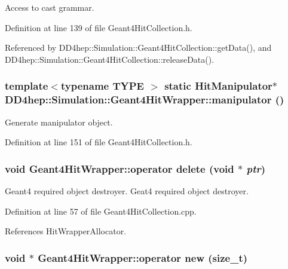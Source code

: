 Access to cast grammar. 

Definition at line 139 of file Geant4HitCollection.h.

Referenced by DD4hep::Simulation::Geant4HitCollection::getData(), and DD4hep::Simulation::Geant4HitCollection::releaseData().\hypertarget{class_d_d4hep_1_1_simulation_1_1_geant4_hit_wrapper_ad5159a11581cd209582a4fa3da961e71}{
\subsubsection[{manipulator}]{\setlength{\rightskip}{0pt plus 5cm}template$<$typename TYPE $>$ static {\bf HitManipulator}$\ast$ DD4hep::Simulation::Geant4HitWrapper::manipulator ()}}
\label{class_d_d4hep_1_1_simulation_1_1_geant4_hit_wrapper_ad5159a11581cd209582a4fa3da961e71}


Generate manipulator object. 

Definition at line 151 of file Geant4HitCollection.h.\hypertarget{class_d_d4hep_1_1_simulation_1_1_geant4_hit_wrapper_a3ca9f5bf49528ab59adaa68d2708f8c3}{
\subsubsection[{operator delete}]{\setlength{\rightskip}{0pt plus 5cm}void Geant4HitWrapper::operator delete (void $\ast$ {\em ptr})}}
\label{class_d_d4hep_1_1_simulation_1_1_geant4_hit_wrapper_a3ca9f5bf49528ab59adaa68d2708f8c3}


Geant4 required object destroyer. Geat4 required object destroyer. 

Definition at line 57 of file Geant4HitCollection.cpp.

References HitWrapperAllocator.\hypertarget{class_d_d4hep_1_1_simulation_1_1_geant4_hit_wrapper_a645e452e2bb8c642286e323e514f0fef}{
\subsubsection[{operator new}]{\setlength{\rightskip}{0pt plus 5cm}void $\ast$ Geant4HitWrapper::operator new (size\_\-t)}}
\label{class_d_d4hep_1_1_simulation_1_1_geant4_hit_wrapper_a645e452e2bb8c642286e323e514f0fef}


